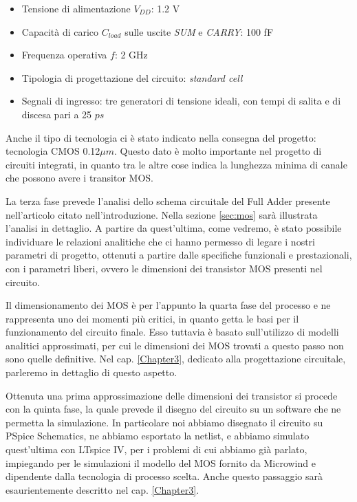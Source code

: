 \begin{itemize}
	\item Tensione di alimentazione $V _{DD}$: 1.2 V
	\item Capacità di carico $C _{load}$ sulle uscite \textit{SUM} e \textit{CARRY}: 100 fF
	\item Frequenza operativa $f$: 2 GHz
	\item Tipologia di progettazione del circuito: \textit{standard cell}
	\item Segnali di ingresso: tre generatori di tensione ideali, con tempi di salita e di discesa pari a 25 $ps$
\end{itemize}

Anche il tipo di tecnologia ci è stato indicato nella consegna del progetto: tecnologia CMOS 0.12$\mu m$. Questo dato è molto importante nel progetto di circuiti integrati, in quanto tra le altre cose indica la lunghezza minima di canale che possono avere i transitor MOS.

La terza fase prevede l'analisi dello schema circuitale del Full Adder presente nell'articolo citato nell'introduzione. Nella sezione \ref{sec:mos} sarà illustrata l'analisi in dettaglio. A partire da quest'ultima, come vedremo, è stato possibile individuare le relazioni analitiche che ci hanno permesso di legare i nostri parametri di progetto, ottenuti a partire dalle specifiche funzionali e prestazionali, con i parametri liberi, ovvero le dimensioni dei transistor MOS presenti nel circuito. 

Il dimensionamento dei MOS è per l'appunto la quarta fase del processo e ne rappresenta uno dei momenti più critici, in quanto getta le basi per il funzionamento del circuito finale. Esso tuttavia è basato sull'utilizzo di modelli analitici approssimati, per cui le dimensioni dei MOS trovati a questo passo non sono quelle definitive. Nel cap. \ref{Chapter3}, dedicato alla progettazione circuitale, parleremo in dettaglio di questo aspetto.

Ottenuta una prima approssimazione delle dimensioni dei transistor si procede con la quinta fase, la quale prevede il disegno del circuito su un software che ne permetta la simulazione. In particolare noi abbiamo disegnato il circuito su PSpice Schematics, ne abbiamo esportato la netlist, e abbiamo simulato quest'ultima con LTspice IV, per i problemi di cui abbiamo già parlato, impiegando per le simulazioni il modello del MOS fornito da Microwind e dipendente dalla tecnologia di processo scelta. Anche questo passaggio sarà esaurientemente descritto nel cap. \ref{Chapter3}.

